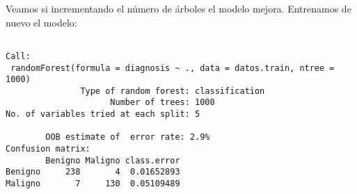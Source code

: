 \documentclass[
]{article}
\newenvironment{Shaded}{\begin{snugshade}}{\end{snugshade}}
\newcommand{\DataTypeTok}[1]{\textcolor[rgb]{0.13,0.29,0.53}{#1}}
\newcommand{\DecValTok}[1]{\textcolor[rgb]{0.00,0.00,0.81}{#1}}
\newcommand{\FloatTok}[1]{\textcolor[rgb]{0.00,0.00,0.81}{#1}}
\newcommand{\KeywordTok}[1]{\textcolor[rgb]{0.13,0.29,0.53}{\textbf{#1}}}
\newcommand{\NormalTok}[1]{#1}
\newcommand{\OperatorTok}[1]{\textcolor[rgb]{0.81,0.36,0.00}{\textbf{#1}}}
\newcommand{\StringTok}[1]{\textcolor[rgb]{0.31,0.60,0.02}{#1}}
\begin{document}
Veamos si incrementando el número de árboles el modelo mejora.
Entrenamos de nuevo el modelo:

\begin{Shaded}
\end{Shaded}

\begin{verbatim}

Call:
 randomForest(formula = diagnosis ~ ., data = datos.train, ntree = 1000) 
               Type of random forest: classification
                     Number of trees: 1000
No. of variables tried at each split: 5

        OOB estimate of  error rate: 2.9%
Confusion matrix:
        Benigno Maligno class.error
Benigno     238       4  0.01652893
Maligno       7     130  0.05109489
\end{verbatim}

\begin{Shaded}
\end{Shaded}
\end{document}
